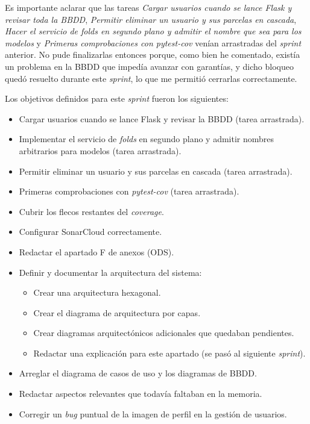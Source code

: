 Es importante aclarar que las tareas \textit{Cargar usuarios cuando se lance Flask y revisar toda la BBDD}, \textit{Permitir eliminar un usuario y sus parcelas en cascada}, \textit{Hacer el servicio de folds en segundo plano y admitir el nombre que sea para los modelos} y \textit{Primeras comprobaciones con pytest-cov} venían arrastradas del \textit{sprint} anterior. No pude finalizarlas entonces porque, como bien he comentado, existía un problema en la BBDD que impedía avanzar con garantías, y dicho bloqueo quedó resuelto durante este \textit{sprint}, lo que me permitió cerrarlas correctamente.

Los objetivos definidos para este \textit{sprint} fueron los siguientes:
\begin{itemize}
	\item Cargar usuarios cuando se lance Flask y revisar la BBDD (tarea arrastrada).
	\item Implementar el servicio de \textit{folds} en segundo plano y admitir nombres arbitrarios para modelos (tarea arrastrada).
	\item Permitir eliminar un usuario y sus parcelas en cascada (tarea arrastrada).
	\item Primeras comprobaciones con \textit{pytest-cov} (tarea arrastrada).
	\item Cubrir los flecos restantes del \textit{coverage}.
	\item Configurar SonarCloud correctamente.
	\item Redactar el apartado F de anexos (ODS).
	\item Definir y documentar la arquitectura del sistema:
	\begin{itemize}
		\item Crear una arquitectura hexagonal.
		\item Crear el diagrama de arquitectura por capas.
		\item Crear diagramas arquitectónicos adicionales que quedaban pendientes.
		\item Redactar una explicación para este apartado (se pasó al siguiente \textit{sprint}).
	\end{itemize}
	\item Arreglar el diagrama de casos de uso y los diagramas de BBDD.
	\item Redactar aspectos relevantes que todavía faltaban en la memoria.
	\item Corregir un \textit{bug} puntual de la imagen de perfil en la gestión de usuarios.
\end{itemize}

